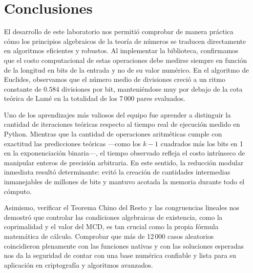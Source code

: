 \section{Conclusiones}

El desarrollo de este laboratorio nos permitió comprobar de manera práctica cómo los principios algebraicos de la teoría de números se traducen directamente en algoritmos eficientes y robustos. Al implementar la biblioteca, confirmamos que el costo computacional de estas operaciones debe medirse siempre en función de la longitud en bits de la entrada y no de su valor numérico. En el algoritmo de Euclides, observamos que el número medio de divisiones creció a un ritmo constante de $0.584$ divisiones por bit, manteniéndose muy por debajo de la cota teórica de Lamé en la totalidad de los 7\,000 pares evaluados.

Uno de los aprendizajes más valiosos del equipo fue aprender a distinguir la cantidad de iteraciones teóricas respecto al tiempo real de ejecución medido en Python. Mientras que la cantidad de operaciones aritméticas cumple con exactitud las predicciones teóricas ---como los $k - 1$ cuadrados más los bits en 1 en la exponenciación binaria---, el tiempo observado refleja el costo intrínseco de manipular enteros de precisión arbitraria. En este sentido, la reducción modular inmediata resultó determinante: evitó la creación de cantidades intermedias inmanejables de millones de bits y mantuvo acotada la memoria durante todo el cómputo.

Asimismo, verificar el Teorema Chino del Resto y las congruencias lineales nos demostró que controlar las condiciones algebraicas de existencia, como la coprimalidad y el valor del MCD, es tan crucial como la propia fórmula matemática de cálculo. Comprobar que más de 12\,000 casos aleatorios coincidieron plenamente con las funciones nativas y con las soluciones esperadas nos da la seguridad de contar con una base numérica confiable y lista para su aplicación en criptografía y algoritmos avanzados.
